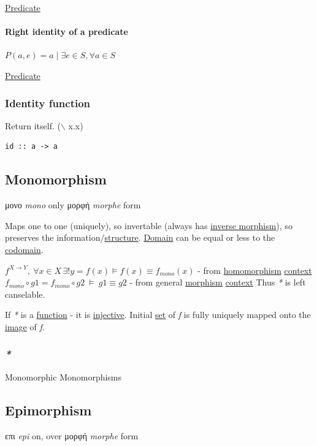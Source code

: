 \documentclass[a4paper,14pt,oneside]{book}
\begin{document}
\hyperref[org2ee83a4]{Predicate}

\paragraph{\label{orgbb7b3f2}Right identity of a predicate}
\label{sec:org4117751}
\(P(a,e)=a \; | \; \exists e \in S, \forall a \in S\)

\hyperref[org2ee83a4]{Predicate}

\subsubsection{\label{orge3540de}Identity function}
\label{sec:org1132bca}
Return itself.
($\backslash$ x.x)
\begin{verbatim}
id :: a -> a
\end{verbatim}

\subsection{\label{org9e520fb}Monomorphism}
\label{sec:org16f9eee}
μονο \emph{mono} only
μορφή \emph{morphe} form

Maps one to one (uniquely), so invertable (always has \hyperref[org9a331e8]{inverse morphism}), so preserves the information/\hyperref[org105c77d]{structure}.
\hyperref[orga435ae0]{Domain} can be equal or less to the \hyperref[orgc81ff1a]{codomain}.

\(f^{X \to Y}, \ \forall x \in X \, \exists! y=f(x) \vDash f(x) \equiv f_{mono}(x)\) - from \hyperref[org829f1c4]{homomorphism} \hyperref[orgd7d1033]{context}
\(f_{mono} \circ g1 = f_{mono} \circ g2 \ \vDash \ g1 \equiv g2\) - from general \hyperref[orgcfa41a6]{morphism} \hyperref[orgd7d1033]{context}
Thus \emph{*} is left canselable.

If \emph{*} is a \hyperref[orgc39a15c]{function} - it is \hyperref[orgdb02211]{injective}. Initial \hyperref[org28abdc9]{set} of \emph{f} is fully uniquely mapped onto the \hyperref[orgd75a795]{image} of \emph{f}.

\subsubsection{\emph{*}}
\label{sec:org73b7203}

\label{org7b730e3}Monomorphic
\label{orgd1a5b3d}Monomorphisms

\subsection{\label{org15709d9}Epimorphism}
\label{sec:org0e74a84}
επι \emph{epi} on, over
μορφή \emph{morphe} form
\end{document}
